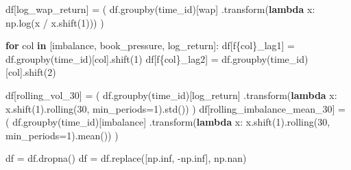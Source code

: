 \documentclass[
  letterpaper,
  DIV=11,
  numbers=noendperiod]{scrartcl}
\newenvironment{Shaded}{\begin{snugshade}}{\end{snugshade}}
\newcommand{\ControlFlowTok}[1]{\textcolor[rgb]{0.00,0.23,0.31}{\textbf{#1}}}
\newcommand{\DecValTok}[1]{\textcolor[rgb]{0.68,0.00,0.00}{#1}}
\newcommand{\KeywordTok}[1]{\textcolor[rgb]{0.00,0.23,0.31}{\textbf{#1}}}
\newcommand{\NormalTok}[1]{\textcolor[rgb]{0.00,0.23,0.31}{#1}}
\newcommand{\OperatorTok}[1]{\textcolor[rgb]{0.37,0.37,0.37}{#1}}
\newcommand{\SpecialCharTok}[1]{\textcolor[rgb]{0.37,0.37,0.37}{#1}}
\newcommand{\SpecialStringTok}[1]{\textcolor[rgb]{0.13,0.47,0.30}{#1}}
\newcommand{\StringTok}[1]{\textcolor[rgb]{0.13,0.47,0.30}{#1}}
\begin{document}
\begin{Shaded}
\begin{Highlighting}[]
\NormalTok{    df[}\StringTok{\textquotesingle{}log\_wap\_return\textquotesingle{}}\NormalTok{] }\OperatorTok{=}\NormalTok{ (}
\NormalTok{        df.groupby(}\StringTok{\textquotesingle{}time\_id\textquotesingle{}}\NormalTok{)[}\StringTok{\textquotesingle{}wap\textquotesingle{}}\NormalTok{]}
\NormalTok{          .transform(}\KeywordTok{lambda}\NormalTok{ x: np.log(x }\OperatorTok{/}\NormalTok{ x.shift(}\DecValTok{1}\NormalTok{)))}
\NormalTok{    )}

    \ControlFlowTok{for}\NormalTok{ col }\KeywordTok{in}\NormalTok{ [}\StringTok{\textquotesingle{}imbalance\textquotesingle{}}\NormalTok{, }\StringTok{\textquotesingle{}book\_pressure\textquotesingle{}}\NormalTok{, }\StringTok{\textquotesingle{}log\_return\textquotesingle{}}\NormalTok{]:}
\NormalTok{        df[}\SpecialStringTok{f\textquotesingle{}}\SpecialCharTok{\{}\NormalTok{col}\SpecialCharTok{\}}\SpecialStringTok{\_lag1\textquotesingle{}}\NormalTok{] }\OperatorTok{=}\NormalTok{ df.groupby(}\StringTok{\textquotesingle{}time\_id\textquotesingle{}}\NormalTok{)[col].shift(}\DecValTok{1}\NormalTok{)}
\NormalTok{        df[}\SpecialStringTok{f\textquotesingle{}}\SpecialCharTok{\{}\NormalTok{col}\SpecialCharTok{\}}\SpecialStringTok{\_lag2\textquotesingle{}}\NormalTok{] }\OperatorTok{=}\NormalTok{ df.groupby(}\StringTok{\textquotesingle{}time\_id\textquotesingle{}}\NormalTok{)[col].shift(}\DecValTok{2}\NormalTok{)}

\NormalTok{    df[}\StringTok{\textquotesingle{}rolling\_vol\_30\textquotesingle{}}\NormalTok{] }\OperatorTok{=}\NormalTok{ (}
\NormalTok{        df.groupby(}\StringTok{\textquotesingle{}time\_id\textquotesingle{}}\NormalTok{)[}\StringTok{\textquotesingle{}log\_return\textquotesingle{}}\NormalTok{]}
\NormalTok{          .transform(}\KeywordTok{lambda}\NormalTok{ x: x.shift(}\DecValTok{1}\NormalTok{).rolling(}\DecValTok{30}\NormalTok{, min\_periods}\OperatorTok{=}\DecValTok{1}\NormalTok{).std())}
\NormalTok{    )}
\NormalTok{    df[}\StringTok{\textquotesingle{}rolling\_imbalance\_mean\_30\textquotesingle{}}\NormalTok{] }\OperatorTok{=}\NormalTok{ (}
\NormalTok{        df.groupby(}\StringTok{\textquotesingle{}time\_id\textquotesingle{}}\NormalTok{)[}\StringTok{\textquotesingle{}imbalance\textquotesingle{}}\NormalTok{]}
\NormalTok{          .transform(}\KeywordTok{lambda}\NormalTok{ x: x.shift(}\DecValTok{1}\NormalTok{).rolling(}\DecValTok{30}\NormalTok{, min\_periods}\OperatorTok{=}\DecValTok{1}\NormalTok{).mean())}
\NormalTok{    )}

\NormalTok{    df }\OperatorTok{=}\NormalTok{ df.dropna()   }
\NormalTok{    df }\OperatorTok{=}\NormalTok{ df.replace([np.inf, }\OperatorTok{{-}}\NormalTok{np.inf], np.nan)}


\end{Highlighting}
\end{Shaded}
\end{document}
